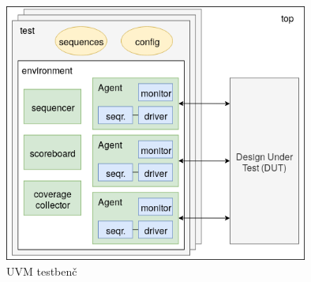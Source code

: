 \begin{figure}[h!]
  \centering
  \includegraphics[width=100mm]{img/v5_typical_tb.png}
  \caption{UVM testbenč}
  \label{fig:typical_tb}
\end{figure}

